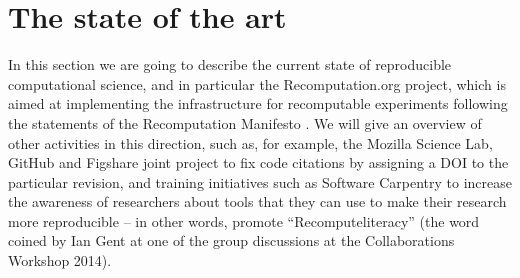 \section{The state of the art}
\label{s:recomputation}

In this section we are going to describe the current state of reproducible computational science, and
in particular the Recomputation.org project, which is aimed at implementing
the infrastructure for recomputable experiments following the statements of the Recomputation
Manifesto \cite{gent:recomputation}. We will give an overview of other activities in this
direction, such as, for example, the Mozilla Science Lab, GitHub and Figshare joint project to fix code
citations by assigning a DOI to the particular revision, and training initiatives such as Software
Carpentry to increase the awareness of researchers about tools that they can use to make their
research more reproducible -- in other words, promote ``Recomputeliteracy'' (the word coined by 
Ian Gent at one of the group discussions at the Collaborations Workshop 2014).

